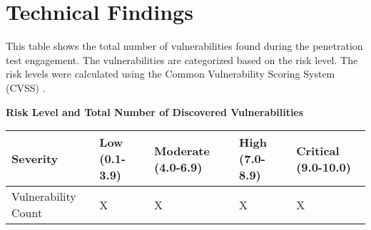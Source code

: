 \section{Technical Findings}
\label{sec:tech}
This table shows the total number of vulnerabilities found during the penetration test engagement. The vulnerabilities are categorized based on the risk level. The risk levels were calculated using the Common Vulnerability Scoring System (CVSS) \cite{cvssdocs}.

\begin{center}
\textbf{Risk Level and Total Number of Discovered Vulnerabilities}
\end{center}

\setlength\arrayrulewidth{1.25pt}

\begin{table}[h]
\renewcommand{\arraystretch}{2}
    \centering
    \begin{tabular}{|>{\large}p{11em}|>{\large}p{5em}|>{\large}p{5em}|>{\large}p{5em}|>{\large}p{6em}|}\hline
         Severity & \cellcolor{green}Low \newline (0.1-3.9) & \cellcolor{yellow}Moderate (4.0-6.9) & \cellcolor{orange}High (7.0-8.9) & \cellcolor{red}Critical (9.0-10.0)\\\hline
        Vulnerability Count& X & X & X & X \\\hline
    \end{tabular}
\end{table}

